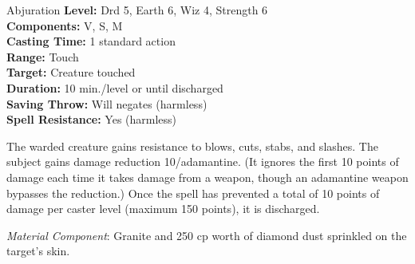 {Abjuration}
{
	\textbf{Level:}
	Drd 5, Earth 6, Wiz 4, Strength 6\\
	\textbf{Components:}
	V, S, M\\
	\textbf{Casting Time:}
	1 standard action\\
	\textbf{Range:}
	Touch\\
	\textbf{Target:}
	Creature touched\\
	\textbf{Duration:}
	10 min./level or until discharged\\
	\textbf{Saving Throw:}
	Will negates (harmless)\\
	\textbf{Spell Resistance:}
	Yes (harmless)\\
}
{
	The warded creature gains resistance to blows, cuts, stabs, and slashes. The subject gains damage reduction 10/adamantine. (It ignores the first 10 points of damage each time it takes damage from a weapon, though an adamantine weapon bypasses the reduction.) Once the spell has prevented a total of 10 points of damage per caster level (maximum 150 points), it is discharged.

	\textit{Material Component}:
	Granite and 250 cp worth of diamond dust sprinkled on the target's skin.

}
